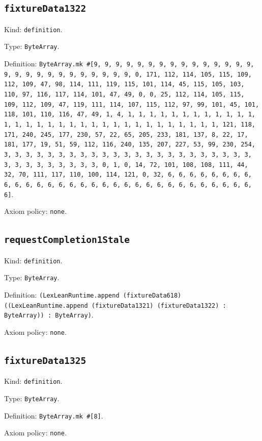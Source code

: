 \documentclass[11pt]{article}
\begin{document}
\subsection*{\texttt{fixtureData1322}}
\noindent Kind: \texttt{definition}.\par
\noindent Type: \texttt{ByteArray}.\par
\noindent Definition: \texttt{ByteArray.mk \#[9, 9, 9, 9, 9, 9, 9, 9, 9, 9, 9, 9, 9, 9, 9, 9, 9, 9, 9, 9, 9, 9, 9, 9, 9, 9, 9, 0, 171, 112, 114, 105, 115, 109, 112, 109, 47, 98, 114, 111, 119, 115, 101, 114, 45, 115, 105, 103, 110, 97, 116, 117, 114, 101, 47, 49, 0, 0, 25, 112, 114, 105, 115, 109, 112, 109, 47, 119, 111, 114, 107, 115, 112, 97, 99, 101, 45, 101, 118, 101, 110, 116, 47, 49, 1, 4, 1, 1, 1, 1, 1, 1, 1, 1, 1, 1, 1, 1, 1, 1, 1, 1, 1, 1, 1, 1, 1, 1, 1, 1, 1, 1, 1, 1, 1, 1, 1, 1, 121, 118, 171, 240, 245, 177, 230, 57, 22, 65, 205, 233, 181, 137, 8, 22, 17, 181, 177, 19, 51, 59, 112, 116, 240, 135, 207, 227, 53, 99, 230, 254, 3, 3, 3, 3, 3, 3, 3, 3, 3, 3, 3, 3, 3, 3, 3, 3, 3, 3, 3, 3, 3, 3, 3, 3, 3, 3, 3, 3, 3, 3, 3, 3, 0, 1, 0, 14, 72, 101, 108, 108, 111, 44, 32, 70, 111, 117, 110, 100, 114, 121, 0, 32, 6, 6, 6, 6, 6, 6, 6, 6, 6, 6, 6, 6, 6, 6, 6, 6, 6, 6, 6, 6, 6, 6, 6, 6, 6, 6, 6, 6, 6, 6, 6, 6]}.\par
\noindent Axiom policy: \texttt{none}.\par
\subsection*{\texttt{requestCompletion1Stale}}
\noindent Kind: \texttt{definition}.\par
\noindent Type: \texttt{ByteArray}.\par
\noindent Definition: \texttt{(LexLeanRuntime.append (fixtureData618) ((LexLeanRuntime.append (fixtureData1321) (fixtureData1322) : ByteArray)) : ByteArray)}.\par
\noindent Axiom policy: \texttt{none}.\par
\subsection*{\texttt{fixtureData1325}}
\noindent Kind: \texttt{definition}.\par
\noindent Type: \texttt{ByteArray}.\par
\noindent Definition: \texttt{ByteArray.mk \#[8]}.\par
\noindent Axiom policy: \texttt{none}.\par
\end{document}
